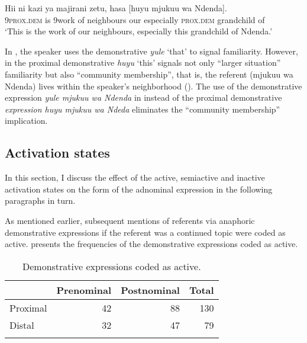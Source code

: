 \documentclass[output=paper,
modfonts
]{langscibook}
\begin{document}
\ea\label{ex:mwamzandi:19}
\gll  Hii ni kazi ya majirani zetu, hasa [huyu mjukuu wa Ndenda].\\
     9\textsc{prox}.\textsc{dem} is 9work of neighbours our especially \textsc{prox}.\textsc{dem} grandchild of \\
\glt ‘This is the work of our neighbours, especially this grandchild of Ndenda.’
\z

In , the speaker uses the  demonstrative \textit{yule} ‘that’ to signal familiarity. However, in  the proximal demonstrative \textit{huyu} ‘this’ signals not only “larger situation” familiarity \citep{Hawkins1978} but also “community membership”, that is, the referent (mjukuu wa Ndenda) lives within the speaker’s neighborhood (\citealt{ClarkMarshall1981}). The use of the  demonstrative expression \textit{yule mjukuu wa Ndenda} in  instead of the proximal demonstrative \textit{expression huyu mjukuu wa Ndeda} eliminates the “community membership” implication.


\subsection{Activation states}\label{sec:mwamzandi:3.2}

In this section, I discuss the effect of the active, semiactive and inactive activation states on the form of the adnominal expression in the following paragraphs in turn.

As mentioned earlier, subsequent mentions of referents via anaphoric demonstrative expressions if the referent was a continued topic were coded as active.  presents the frequencies of the demonstrative expressions coded as active.

\begin{table}
\begin{tabularx}{.66\textwidth}{Xrrr} 
\lsptoprule
& {\bfseries Prenominal} & {\bfseries Postnominal} & {\bfseries Total}\\
\midrule
{ Proximal} & 42 & 88 & 130\\
{ Distal} & 32 & 47 & 79\\
\lspbottomrule
\end{tabularx}

\caption{Demonstrative expressions coded as active.}
\label{tab:mwamzandi:6}
\end{table}
\end{document}
